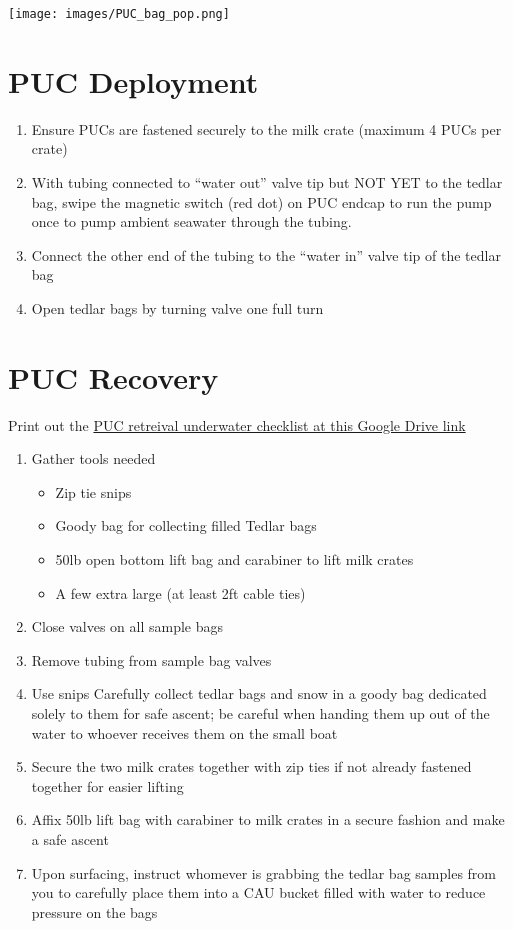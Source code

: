 \documentclass[]{book}
\providecommand{\tightlist}{%
  \setlength{\itemsep}{0pt}\setlength{\parskip}{0pt}}
\begin{document}
\texttt{[image: images/PUC\_bag\_pop.png]}

\section{PUC Deployment}\label{puc-deployment}

\begin{enumerate}
\def\labelenumi{\arabic{enumi}.}
\tightlist
\item
  Ensure PUCs are fastened securely to the milk crate (maximum 4 PUCs
  per crate)
\item
  With tubing connected to ``water out'' valve tip but NOT YET to the
  tedlar bag, swipe the magnetic switch (red dot) on PUC endcap to run
  the pump once to pump ambient seawater through the tubing.
\item
  Connect the other end of the tubing to the ``water in'' valve tip of
  the tedlar bag
\item
  Open tedlar bags by turning valve one full turn
\end{enumerate}

\section{PUC Recovery}\label{puc-recovery}

Print out the
\href{https://drive.google.com/drive/folders/1X6fAG4OIDs66Ji5xzYsX8JySqhkSs5k-}{PUC
retreival underwater checklist at this Google Drive link}

\begin{enumerate}
\def\labelenumi{\arabic{enumi}.}
\tightlist
\item
  Gather tools needed

  \begin{itemize}
  \tightlist
  \item
    Zip tie snips
  \item
    Goody bag for collecting filled Tedlar bags
  \item
    50lb open bottom lift bag and carabiner to lift milk crates
  \item
    A few extra large (at least 2ft cable ties)
  \end{itemize}
\item
  Close valves on all sample bags
\item
  Remove tubing from sample bag valves
\item
  Use snips Carefully collect tedlar bags and snow in a goody bag
  dedicated solely to them for safe ascent; be careful when handing them
  up out of the water to whoever receives them on the small boat
\item
  Secure the two milk crates together with zip ties if not already
  fastened together for easier lifting
\item
  Affix 50lb lift bag with carabiner to milk crates in a secure fashion
  and make a safe ascent
\item
  Upon surfacing, instruct whomever is grabbing the tedlar bag samples
  from you to carefully place them into a CAU bucket filled with water
  to reduce pressure on the bags
\end{enumerate}
\end{document}
